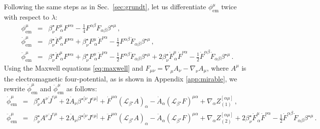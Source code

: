 \documentclass[
a4paper,
amsfonts,
amsmath,
reprint,
showkeys,
nofootinbib,
twoside,
onecolumn,
notitlepage
]{revtex4-1}
\begin{document}
	Following the same steps as in Sec.\ \ref{sec:grundt}, let us differentiate $\phi^\mu_{\text{em}}$ twice with respect to $\lambda$:
	\begin{subequations}
		\begin{eqnarray}
			\label{eq:em-phi-step-0}
			\phi^\mu_{\text{em}} &=& \beta^\star_\nu F^{\mu}_{\,\alpha}F^{\nu\alpha} - \frac{1}{4}F^{\alpha \beta}F_{\alpha \beta} \beta^{\star \mu}  \, ,\\
			\label{eq:em-phidot-step-0}
			\dot{\phi}^\mu_{\text{em}} &=& \beta^\star_\nu \dot{F}^{\mu}_{\,\alpha}F^{\nu\alpha}+\beta^\star_\nu F^{\mu}_{\,\alpha}\dot{F}^{\nu\alpha} - \frac{1}{2}F^{\alpha \beta}\dot{F}_{\alpha \beta} \beta^{\star \mu}  \, ,\\
			\label{eq:em-phiddot-step-0}
			\ddot{\phi}^\mu_{\text{em}} &=&  \beta^\star_\nu \ddot{F}^{\mu}_{\,\alpha}F^{\nu\alpha}+\beta^\star_\nu F^{\mu}_{\,\alpha}\ddot{F}^{\nu\alpha} - \frac{1}{2}F^{\alpha \beta}\ddot{F}_{\alpha \beta} \beta^{\star \mu} +2\beta^\star_\nu \dot{F}^{\mu}_{\,\alpha}\dot{F}^{\nu\alpha}-\frac{1}{2}\dot{F}^{\alpha \beta}\dot{F}_{\alpha \beta} \beta^{\star \mu} \, .
		\end{eqnarray}
	\end{subequations}
	Using the Maxwell equations \eqref{eq:maxwell} and $F_{\mu \nu}{=}\nabla_\mu A_\nu {-}\nabla_\nu A_\mu$, where $A^\mu$ is the electromagnetic four-potential, as is shown in Appendix \ref{app:mirable}, we rewrite $\dot{\phi}^\mu_{\text{em}}$ and $\ddot{\phi}^\mu_{\text{em}}$ as follows:
	\begin{subequations}
		\label{eq:mirable}
		\begin{eqnarray}
			\label{eq:mirable-dot}
			\dot{\phi}^\mu_{\text{em}} &=& \beta^\star_\nu A^\nu \dot{J}^{e\mu} + 2\dot{A}_\nu \beta^{\star [\nu}J^{e\mu]}+\dot{F}^{\mu \alpha} (\mathcal{L}_{\beta^\star}A)_\alpha - \dot{A}_\alpha (\mathcal{L}_{\beta^\star}F)^{\mu \alpha}+\nabla_\alpha Z_{(1)}^{[\alpha \mu]}  \, ,\\   
			\label{eq:mirable-ddot}
			\ddot{\phi}^\mu_{\text{em}} &=& \beta^\star_\nu A^\nu \ddot{J}^{e\mu} + 2\ddot{A}_\nu \beta^{\star [\nu}J^{e\mu]}+\ddot{F}^{\mu \alpha} (\mathcal{L}_{\beta^\star}A)_\alpha - \ddot{A}_\alpha (\mathcal{L}_{\beta^\star}F)^{\mu \alpha}+\nabla_\alpha Z_{(2)}^{[\alpha \mu]}  +2\beta^\star_\nu \dot{F}^{\mu}_{\,\alpha}\dot{F}^{\nu\alpha}-\frac{1}{2}\dot{F}^{\alpha \beta}\dot{F}_{\alpha \beta} \beta^{\star \mu} \, .
		\end{eqnarray}
	\end{subequations}
\end{document}
